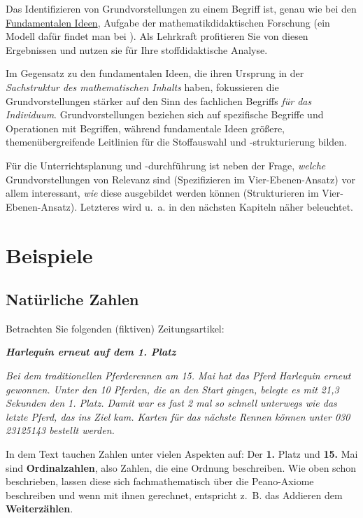 \documentclass[
]{scrbook}
\renewenvironment{quote}{
  \list{}{
	\leftmargin0.2cm   %
    \rightmargin\leftmargin
      	\def\FrameCommand
    {%
        {\color{quoteColor}\vrule width 2pt}%
        \hspace{0pt}%
    }%
    \MakeFramed{\advance \hsize -\width \FrameRestore}    \color{quoteColor}
    }
  \item\relax
}
{\endlist\color{black}\endMakeFramed}
\theoremstyle{definition}
\theoremstyle{definition}
\theoremstyle{definition}
\theoremstyle{definition}
\theoremstyle{remark}
\begin{document}
Das Identifizieren von Grundvorstellungen zu einem Begriff ist, genau wie bei den \hyperref[fundamentale-ideen]{Fundamentalen Ideen}, Aufgabe der mathematikdidaktischen Forschung (ein Modell dafür findet man bei ). Als Lehrkraft profitieren Sie von diesen Ergebnissen und nutzen sie für Ihre stoffdidaktische Analyse.

Im Gegensatz zu den fundamentalen Ideen, die ihren Ursprung in der \emph{Sachstruktur des mathematischen Inhalts} haben, fokussieren die Grundvorstellungen stärker auf den Sinn des fachlichen Begriffs \emph{für das Individuum}. Grundvorstellungen beziehen sich auf spezifische Begriffe und Operationen mit Begriffen, während fundamentale Ideen größere, themenübergreifende Leitlinien für die Stoffauswahl und -strukturierung bilden.

Für die Unterrichtsplanung und -durchführung ist neben der Frage, \emph{welche} Grundvorstellungen von Relevanz sind (Spezifizieren im Vier-Ebenen-Ansatz) vor allem interessant, \emph{wie} diese ausgebildet werden können (Strukturieren im Vier-Ebenen-Ansatz). Letzteres wird u.~a. in den nächsten Kapiteln näher beleuchtet.

\section{Beispiele}\label{beispiele}

\subsection{Natürliche Zahlen}\label{natuxfcrliche-zahlen-1}

Betrachten Sie folgenden (fiktiven) Zeitungsartikel:

\begin{quote}
\textbf{\emph{Harlequin erneut auf dem 1. Platz}}

\emph{Bei dem traditionellen Pferderennen am 15. Mai hat das Pferd Harlequin erneut gewonnen. Unter den 10 Pferden, die an den Start gingen, belegte es mit 21,3 Sekunden den 1. Platz. Damit war es fast 2 mal so schnell unterwegs wie das letzte Pferd, das ins Ziel kam. Karten für das nächste Rennen können unter 030 23125143 bestellt werden.}
\end{quote}

In dem Text tauchen Zahlen unter vielen Aspekten auf: Der \textbf{1.} Platz und \textbf{15.} Mai sind \textbf{Ordinalzahlen}, also Zahlen, die eine Ordnung beschreiben. Wie oben schon beschrieben, lassen diese sich fachmathematisch über die Peano-Axiome beschreiben und wenn mit ihnen gerechnet, entspricht z.~B. das Addieren dem \textbf{Weiterzählen}.
\end{document}
